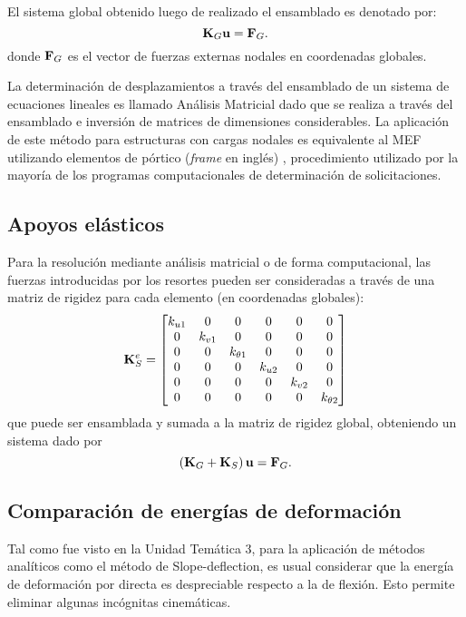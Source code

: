 %
El sistema global obtenido luego de realizado el ensamblado es denotado por:
\begin{equation}
{\bf K}_G {\bf u} = {\bf F}_G.
\end{equation}
donde ${\bf F}_G$ es el vector de fuerzas externas nodales en coordenadas globales.

La determinación de desplazamientos a través del ensamblado de un sistema de ecuaciones lineales es llamado Análisis Matricial dado que se realiza a través del ensamblado e inversión de matrices de dimensiones considerables. %
%
La aplicación de este método para estructuras con cargas nodales es equivalente al MEF utilizando elementos de pórtico (\textit{frame} en inglés) \citep{Onate2013}, procedimiento utilizado por la mayoría de los programas computacionales de determinación de solicitaciones.

\subsection{Apoyos elásticos}

Para la resolución mediante análisis matricial o  de forma computacional, las fuerzas introducidas por los resortes pueden ser consideradas a través de una matriz de rigidez para cada elemento (en coordenadas globales):
\begin{equation}
{\bf K}_S^e = 
\left[
\begin{matrix}
k_{u1} & 0 & 0 & 0 &  0 & 0 \\
0 & k_{v1} & 0 & 0 &  0 & 0\\
0 & 0 &k_{\theta1} & 0 &  0 & 0\\
0 & 0 &0  &   k_{u2} & 0& 0\\
0 & 0 &0  &  0 & k_{v2} & 0\\
0 & 0 &0 & 0 &  0 & k_{\theta2}\\
\end{matrix}
\right]
\end{equation}
que puede ser ensamblada y sumada a la matriz de rigidez global, obteniendo un sistema dado por
%
\begin{equation}
\left({\bf K}_G + {\bf K}_S \right) {\bf u} = {\bf F}_G.
\end{equation}

\subsection{Comparación de energías de deformación}

Tal como fue visto en la Unidad Temática 3, para la aplicación de métodos analíticos como el método de Slope-deflection, es usual considerar que la energía de deformación por directa es despreciable respecto a la de flexión. Esto permite eliminar algunas incógnitas cinemáticas. %

